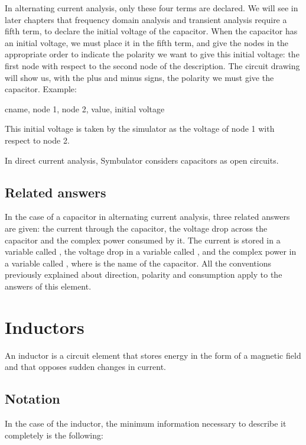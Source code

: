 In alternating current analysis, only these four terms are declared.
We will see in later chapters that frequency domain analysis and
transient analysis require a fifth term, to declare the initial
voltage of the capacitor. When the capacitor has an initial voltage,
we must place it in the fifth term, and give the nodes in the
appropriate order to indicate the polarity we want to give this
initial voltage: the first node with respect to the second node of
the description. The circuit drawing will show us, with the plus and
minus signs, the polarity we must give the capacitor. Example:

\begin{entry}
cname, node 1, node 2, value, initial voltage
\end{entry}

This initial voltage is taken by the simulator as the voltage of
node 1 with respect to node 2.

In direct current analysis, Symbulator considers capacitors as open
circuits.

\subsection{Related answers}

In the case of a capacitor in alternating current analysis, three
related answers are given: the current through the capacitor, the
voltage drop across the capacitor and the complex power consumed by
it. The current is stored in a variable called , the
voltage drop in a variable called , and the complex
power in a variable called , where  is the
name of the capacitor. All the conventions previously explained
about direction, polarity and consumption apply to the answers of
this element.

\section{Inductors}

An inductor is a circuit element that stores energy in the form of a
magnetic field and that opposes sudden changes in current.

\subsection{Notation}

In the case of the inductor, the minimum information necessary to
describe it completely is the following:


